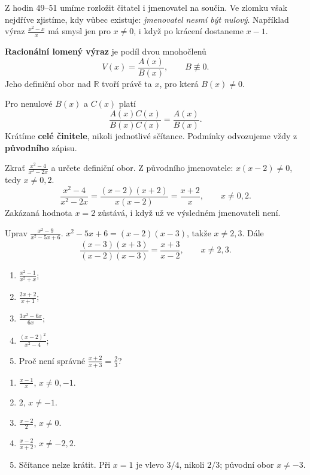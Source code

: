 \documentclass[11pt,a4paper]{article}
\begin{document}
Z hodin 49--51 umíme rozložit čitatel i jmenovatel na součin. Ve zlomku však nejdříve zjistíme, kdy vůbec existuje: \emph{jmenovatel nesmí být nulový}. Například výraz $\frac{x^2-x}{x}$ má smysl jen pro $x\ne0$, i když po krácení dostaneme $x-1$.
\begin{definiceBox}[title={Definice - Racionální lomený výraz}]
\textbf{Racionální lomený výraz} je podíl dvou mnohočlenů
\[V(x)=\frac{A(x)}{B(x)},\qquad B\not\equiv0.\]
Jeho definiční obor nad $\mathbb R$ tvoří právě ta $x$, pro která $B(x)\ne0$.
\end{definiceBox}
\begin{zadaniBox}[title={Věta - Krácení a rozšiřování lomených výrazů}]
Pro nenulové $B(x)$ a $C(x)$ platí
\[\frac{A(x)C(x)}{B(x)C(x)}=\frac{A(x)}{B(x)}.\]
Krátíme \textbf{celé činitele}, nikoli jednotlivé sčítance. Podmínky odvozujeme vždy z \textbf{původního} zápisu.
\end{zadaniBox}
\begin{prikladReseniBox}[breakable=false,title={Příklad 1}]
Zkrať $\displaystyle\frac{x^2-4}{x^2-2x}$ a určete definiční obor.
\tcblower
Z původního jmenovatele: $x(x-2)\ne0$, tedy $x\ne0,2$.
\[\frac{x^2-4}{x^2-2x}=\frac{(x-2)(x+2)}{x(x-2)}=\frac{x+2}{x},\qquad x\ne0,2.\]
Zakázaná hodnota $x=2$ zůstává, i když už ve výsledném jmenovateli není.
\end{prikladReseniBox}
\begin{prikladReseniBox}[breakable=false,title={Příklad 2}]
Uprav $\displaystyle\frac{x^2-9}{x^2-5x+6}$.
\tcblower
$x^2-5x+6=(x-2)(x-3)$, takže $x\ne2,3$. Dále
\[\frac{(x-3)(x+3)}{(x-2)(x-3)}=\frac{x+3}{x-2},\qquad x\ne2,3.\]
\end{prikladReseniBox}
\begin{zadaniReseniBox}[breakable=false,title={Samostatná práce 1}]
\begin{enumerate}[label=\alph*)]
\item $\displaystyle\frac{x^2-1}{x^2+x}$;
\item $\displaystyle\frac{2x+2}{x+1}$;
\item $\displaystyle\frac{3x^2-6x}{6x}$;
\item $\displaystyle\frac{(x-2)^2}{x^2-4}$;
\item Proč není správné $\frac{x+2}{x+3}=\frac23$?
\end{enumerate}
\tcblower
\begin{enumerate}[label=\alph*)]
\item $\frac{x-1}{x}$, $x\ne0,-1$.
\item $2$, $x\ne-1$.
\item $\frac{x-2}{2}$, $x\ne0$.
\item $\frac{x-2}{x+2}$, $x\ne-2,2$.
\item Sčítance nelze krátit. Při $x=1$ je vlevo $3/4$, nikoli $2/3$; původní obor $x\ne-3$.
\end{enumerate}
\end{zadaniReseniBox}
\end{document}
